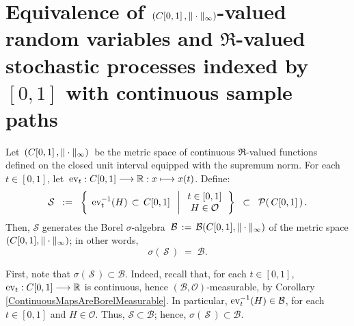

\section{Equivalence of $\left(C[0,1]\,,\Vert\cdot\Vert_{\infty}\right)$-valued random variables
and $\Re$-valued stochastic processes indexed by $[0,1]$ with continuous sample paths}
\setcounter{theorem}{0}
\setcounter{equation}{0}

\renewcommand{\theenumi}{\roman{enumi}}
\renewcommand{\labelenumi}{\textnormal{(\theenumi)}$\;\;$}

\begin{proposition}
\label{OneDSetsGeneratesBCzo}
\mbox{}\vskip 0.1cm
\noindent
Let \,$(C[0,1]\,,\Vert\cdot\Vert_{\infty})$\, be the metric space
of continuous $\Re$-valued functions defined on the closed unit interval
equipped with the supremum norm.
For each $t \in [0,1]$, let \,$\textnormal{ev}_{t} : C[0,1] \longrightarrow \mathbb{R} : x \longmapsto x(t)$.
Define:
\begin{equation*}
\mathcal{S}
\;\; := \;\;
\left\{\;\,
\textnormal{ev}_{t}^{-1}(H) \,\subset\, C[0,1]
\;\;\left\vert\;
\begin{array}{c} t \in [0,1] \\ H \in \mathcal{O} \end{array}
\right.
\right\}
\;\; \subset \;\; \mathcal{P}\!\left(\,C[0,1]\,\right).
\end{equation*}
Then, $\mathcal{S}$ generates the Borel $\sigma$-algebra
\,$\mathcal{B} \,:=\, \mathcal{B}(C[0,1],\Vert\cdot\Vert_{\infty})$
of the metric space $(C[0,1],\Vert\cdot\Vert_{\infty})$;
in other words,
\begin{equation*}
\sigma\!\left(\,\mathcal{S}\,\right) \;=\; \mathcal{B}.
\end{equation*}
\end{proposition}
\proof
First, note that $\sigma\!\left(\,\mathcal{S}\,\right) \subset \mathcal{B}$.
Indeed, recall that, for each $t \in [0,1]$, $\textnormal{ev}_{t} : C[0,1]\longrightarrow\mathbb{R}$ is continuous,
hence $(\mathcal{B},\mathcal{O})$-measurable, by Corollary \ref{ContinuousMapsAreBorelMeasurable}.
In particular, $\textnormal{ev}_{t}^{-1}(H) \in \mathcal{B}$, for each $t \in [0,1]$ and $H \in \mathcal{O}$.
Thus, $\mathcal{S} \subset \mathcal{B}$; hence, $\sigma\!\left(\,\mathcal{S}\,\right) \subset \mathcal{B}$.

